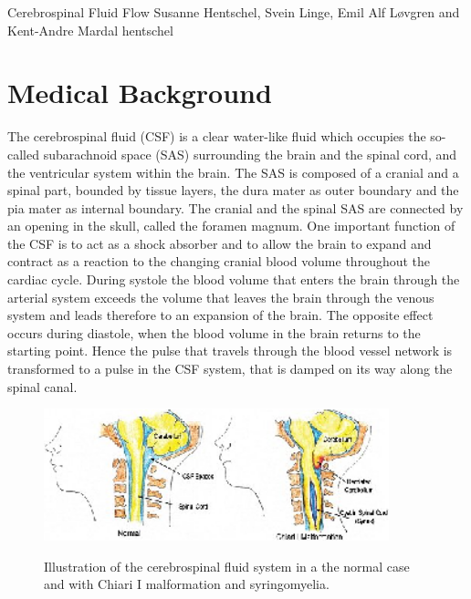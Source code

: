               {Cerebrospinal Fluid Flow}
              {Susanne Hentschel, Svein Linge, Emil Alf L{\o}vgren and Kent-Andre Mardal}
              {hentschel}




\section{Medical Background}

The cerebrospinal fluid (CSF) is a clear water-like fluid which
occupies the so-called subarachnoid space (SAS) surrounding the brain
and the spinal cord, and the ventricular system within the brain. The
SAS is composed of a cranial and a spinal part, bounded by tissue
layers, the dura mater as outer boundary and the pia mater as internal
boundary. The cranial and the spinal SAS are connected by an opening
in the skull, called the foramen magnum. One
important function of the CSF is to act as a shock absorber and to
allow the brain to expand and contract as a reaction to the changing
cranial blood volume throughout the cardiac cycle. During systole the
blood volume that enters the brain through the arterial system exceeds
the volume that leaves the brain through the venous system and leads
therefore to an expansion of the brain. The opposite effect occurs
during diastole, when the blood volume in the brain returns to the
starting point. Hence the pulse that travels through the blood vessel
network is transformed to a pulse in the CSF system, that is damped on
its way along the spinal canal. 


\begin{figure}\begin{center}
\includegraphics[width=100mm]{chapters/hentschel/eps/chiara_about.eps} 
\caption{Illustration of the cerebrospinal fluid system in a the normal case and with Chiari I malformation and syringomyelia.} 
\label{fig:anatomy}
\end{center}\end{figure}

